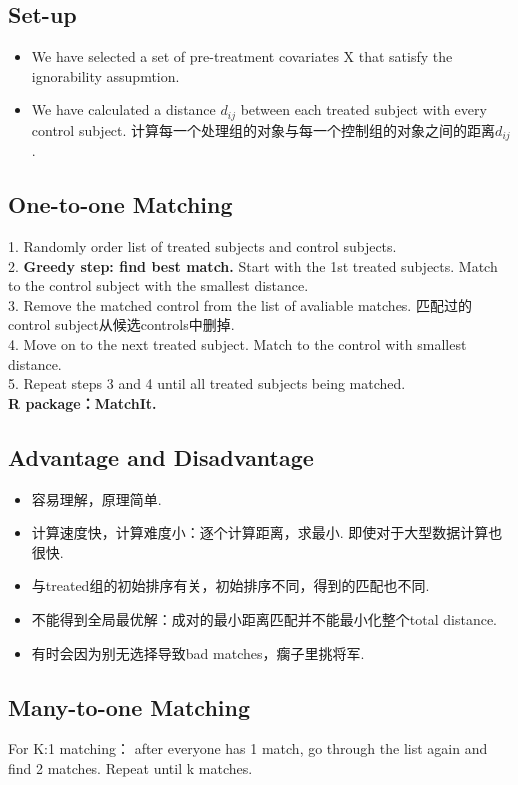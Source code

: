 \subsection{Set-up}
\begin{itemize}
	\item We have selected a set of pre-treatment covariates X that satisfy the ignorability assupmtion.
	\item We have calculated a distance $d_{ij}$ between each treated subject with every control subject. 计算每一个处理组的对象与每一个控制组的对象之间的距离$d_{ij}$.
\end{itemize}

\subsection{One-to-one Matching}
1. Randomly order list of treated subjects and control subjects.\\
2. {\bfseries Greedy step: find best match.} Start with the 1st treated subjects. Match to the control subject with the smallest distance.\\
3. Remove the matched control from the list of avaliable matches. 匹配过的control subject从候选controls中删掉.\\
4. Move on to the next treated subject. Match to the control with smallest distance.\\
5. Repeat steps 3 and 4 until all treated subjects being matched. \\
{\bfseries R package：MatchIt.}

\subsection{Advantage and Disadvantage}
\begin{itemize}
	\item 容易理解，原理简单.
	\item 计算速度快，计算难度小：逐个计算距离，求最小. 即使对于大型数据计算也很快.
	\item 与treated组的初始排序有关，初始排序不同，得到的匹配也不同.
	\item 不能得到全局最优解：成对的最小距离匹配并不能最小化整个total distance.
	\item 有时会因为别无选择导致bad matches，瘸子里挑将军.
\end{itemize}

\subsection{Many-to-one Matching}
For K:1 matching： after everyone has 1 match, go through the list again and find 2 matches. Repeat until k matches.

